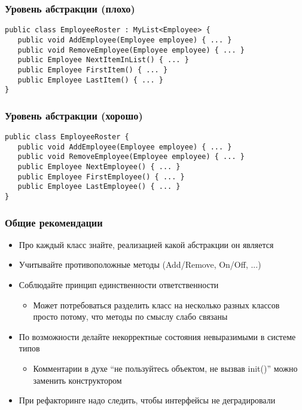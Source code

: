 \documentclass[xetex,mathserif,serif]{beamer}
\begin{document}
	\begin{frame}[fragile]
		\frametitle{Уровень абстракции (плохо)}
		\begin{verbatim}
public class EmployeeRoster : MyList<Employee> {
   public void AddEmployee(Employee employee) { ... }
   public void RemoveEmployee(Employee employee) { ... }
   public Employee NextItemInList() { ... }
   public Employee FirstItem() { ... }
   public Employee LastItem() { ... }
}
		\end{verbatim}
\end{frame}

	\begin{frame}[fragile]
		\frametitle{Уровень абстракции (хорошо)}
		\begin{verbatim}
public class EmployeeRoster {
   public void AddEmployee(Employee employee) { ... }
   public void RemoveEmployee(Employee employee) { ... }
   public Employee NextEmployee() { ... }
   public Employee FirstEmployee() { ... }
   public Employee LastEmployee() { ... }
}
		\end{verbatim}
\end{frame}

	\begin{frame}
		\frametitle{Общие рекомендации}
		\begin{itemize}
			\item Про каждый класс знайте, реализацией какой абстракции он является
			\item Учитывайте противоположные методы (Add/Remove, On/Off, ...)
			\item Соблюдайте принцип единственности ответственности
			\begin{itemize}
				\item Может потребоваться разделить класс на несколько разных классов просто потому, что методы по смыслу слабо связаны
			\end{itemize}
			\item По возможности делайте некорректные состояния невыразимыми в системе типов
			\begin{itemize}
				\item Комментарии в духе ``не пользуйтесь объектом, не вызвав  init()'' можно заменить конструктором
			\end{itemize}
			\item При рефакторинге надо следить, чтобы интерфейсы не деградировали
		\end{itemize}
	\end{frame}
\end{document}
